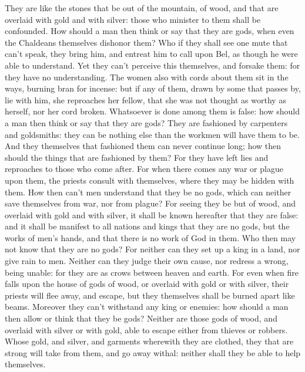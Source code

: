 {They are like the stones that be
{} out of the mountain,
{} of wood, and that are overlaid with gold and with silver: those who minister to them shall be confounded.
How should a man then think or say that they are gods, when even the Chaldeans themselves dishonor them?
Who if they shall see one mute that can’t speak, they bring him, and entreat him to call upon Bel, as though he were able to understand.
Yet they can’t perceive this themselves, and forsake them: for they have no understanding.
The women also with cords about them sit in the ways, burning bran for incense: but if any of them, drawn by some that passes by, lie with him, she reproaches her fellow, that she was not thought as worthy as herself, nor her cord broken.
Whatsoever is done among them is false: how should a man then think or say that they are gods?
They are fashioned by carpenters and goldsmiths: they can be nothing else than the workmen will have them to be.
And they themselves that fashioned them can never continue long; how then should the things that are fashioned by them?
For they have left lies and reproaches to those who come after.
For when there comes any war or plague upon them, the priests consult with themselves, where they may be hidden with them.
How then can’t men understand that they be no gods, which can neither save themselves from war, nor from plague?
For seeing they be but of wood, and overlaid with gold and with silver, it shall be known hereafter that they are false:
and it shall be manifest to all nations and kings that they are no gods, but the works of men’s hands, and that there is no work of God in them.
Who then may not know that they are no gods?
For neither can they set up a king in a land, nor give rain to men.
Neither can they judge their own cause, nor
 redress a wrong, being unable: for they are as crows between heaven and earth.
For even when fire falls upon the house of gods of wood, or overlaid with gold or with silver, their priests will flee away, and escape, but they themselves shall be burned apart like beams.
Moreover they can’t withstand any king or enemies: how should a man then allow or think that they be gods?
Neither are those gods of wood, and overlaid with silver or with gold, able to escape either from thieves or robbers.
Whose gold, and silver, and garments wherewith they are clothed, they that are strong will take from them, and go away withal: neither shall they be able to help themselves.
}

